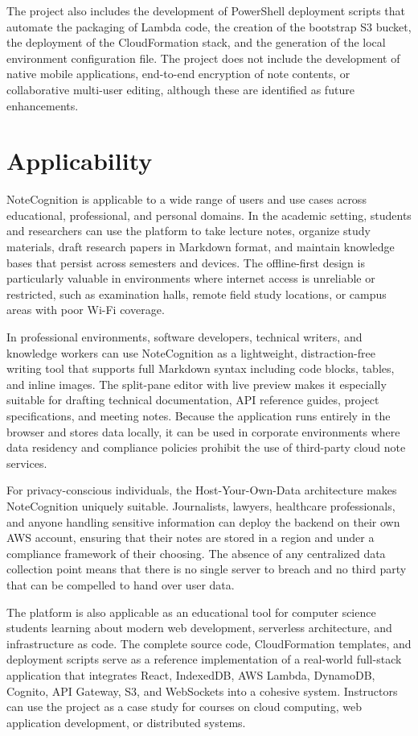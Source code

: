 \documentclass[12pt, a4paper, oneside]{report}
\begin{document}
The project also includes the development of PowerShell deployment scripts that automate the packaging of Lambda code, the creation of the bootstrap S3 bucket, the deployment of the CloudFormation stack, and the generation of the local environment configuration file. The project does not include the development of native mobile applications, end-to-end encryption of note contents, or collaborative multi-user editing, although these are identified as future enhancements.

\section{Applicability}

NoteCognition is applicable to a wide range of users and use cases across educational, professional, and personal domains. In the academic setting, students and researchers can use the platform to take lecture notes, organize study materials, draft research papers in Markdown format, and maintain knowledge bases that persist across semesters and devices. The offline-first design is particularly valuable in environments where internet access is unreliable or restricted, such as examination halls, remote field study locations, or campus areas with poor Wi-Fi coverage.

In professional environments, software developers, technical writers, and knowledge workers can use NoteCognition as a lightweight, distraction-free writing tool that supports full Markdown syntax including code blocks, tables, and inline images. The split-pane editor with live preview makes it especially suitable for drafting technical documentation, API reference guides, project specifications, and meeting notes. Because the application runs entirely in the browser and stores data locally, it can be used in corporate environments where data residency and compliance policies prohibit the use of third-party cloud note services.

For privacy-conscious individuals, the Host-Your-Own-Data architecture makes NoteCognition uniquely suitable. Journalists, lawyers, healthcare professionals, and anyone handling sensitive information can deploy the backend on their own AWS account, ensuring that their notes are stored in a region and under a compliance framework of their choosing. The absence of any centralized data collection point means that there is no single server to breach and no third party that can be compelled to hand over user data.

The platform is also applicable as an educational tool for computer science students learning about modern web development, serverless architecture, and infrastructure as code. The complete source code, CloudFormation templates, and deployment scripts serve as a reference implementation of a real-world full-stack application that integrates React, IndexedDB, AWS Lambda, DynamoDB, Cognito, API Gateway, S3, and WebSockets into a cohesive system. Instructors can use the project as a case study for courses on cloud computing, web application development, or distributed systems.
\end{document}
